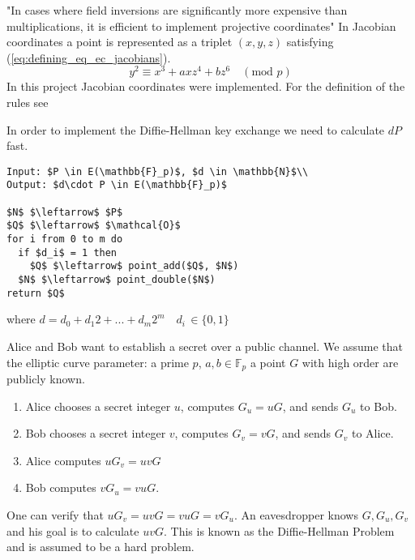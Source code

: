 "In cases where field inversions are significantly more expensive than multiplications, it is efficient to implement projective coordinates" \cite{Blake:1999} In Jacobian coordinates a point is represented as a triplet $(x,y,z)$ satisfying (\ref{eq:defining_eq_ec_jacobians}).
\begin{equation}\label{eq:defining_eq_ec_jacobians}
y^2 \equiv x^3 + axz^4 + bz^6 \quad (\text{mod } p)
\end{equation}
In this project Jacobian coordinates were implemented. For the definition of the rules see \cite[p. 59-60]{Blake:1999}

In order to implement the Diffie-Hellman key exchange we need to calculate $dP$ fast.

\begin{lstlisting}[frame=single, mathescape=true, captionpos=b, caption=double-and-add method]
Input: $P \in E(\mathbb{F}_p)$, $d \in \mathbb{N}$\\
Output: $d\cdot P \in E(\mathbb{F}_p)$

$N$ $\leftarrow$ $P$
$Q$ $\leftarrow$ $\mathcal{O}$
for i from 0 to m do
  if $d_i$ = 1 then
    $Q$ $\leftarrow$ point_add($Q$, $N$)
  $N$ $\leftarrow$ point_double($N$)
return $Q$
\end{lstlisting}
where $d = d_0 + d_1 2 + ... + d_m 2^m \quad d_i \, \in \{0,1\}$

Alice and Bob want to establish a secret over a public channel. We assume that the elliptic curve parameter: a prime $p$, $a, b \in \mathbb{F}_p$ a point $G$ with high order are publicly known.
\begin{enumerate}
\item{Alice chooses a secret integer $u$, computes $G_u = uG$, and sends $G_u$ to Bob.}
\item{Bob chooses a secret integer $v$, computes $G_v = vG$, and sends $G_v$ to Alice.}
\item{Alice computes $uG_v = uvG$}
\item{Bob computes $vG_u = vuG$.}
\end{enumerate}
One can verify that $uG_v = uvG = vuG = v G_u$. An eavesdropper knows $G, G_u, G_v$ and his goal is to calculate $uvG$. This is known as the Diffie-Hellman Problem and is assumed to be a hard problem. 

